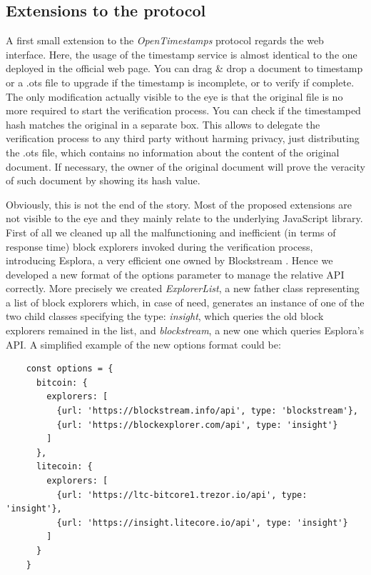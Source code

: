 \bigskip
\subsection{Extensions to the protocol}
\label{sec:extensions}
A first small extension to the \textit{OpenTimestamps} protocol regards the web interface. Here, the usage of the timestamp service is almost identical to the one deployed in the official web page. You can drag \& drop a document to timestamp or a \colorbox{light-gray}{.ots} file to upgrade if the timestamp is incomplete, or to verify if complete. The only modification actually visible to the eye is that the original file is no more required to start the verification process. You can check if the timestamped hash matches the original in a separate box. This allows to delegate the verification process to any third party without harming privacy, just distributing the \colorbox{light-gray}{.ots} file, which contains no information about the content of the original document. If necessary, the owner of the original document will prove the veracity of such document by showing its hash value.

\bigskip
\noindent
Obviously, this is not the end of the story. Most of the proposed extensions are not visible to the eye and they mainly relate to the underlying JavaScript library. First of all we cleaned up all the malfunctioning and inefficient (in terms of response time) block explorers invoked during the verification process, introducing Esplora, a very efficient one owned by Blockstream \cite{Blockstream}. Hence we developed a new format of the options parameter to manage the relative API correctly. More precisely we created \textit{ExplorerList}, a new father class representing a list of block explorers which, in case of need, generates an instance of one of the two child classes specifying the type: \textit{insight}, which queries the old block explorers remained in the list, and \textit{blockstream}, a new one which queries Esplora's API. A simplified example of the new options format could be:

\begin{lstlisting}
    const options = {
      bitcoin: {
        explorers: [
          {url: 'https://blockstream.info/api', type: 'blockstream'},
          {url: 'https://blockexplorer.com/api', type: 'insight'}
        ]
      },
      litecoin: {
        explorers: [
          {url: 'https://ltc-bitcore1.trezor.io/api', type: 'insight'},
          {url: 'https://insight.litecore.io/api', type: 'insight'}
        ]
      }
    }
\end{lstlisting}

